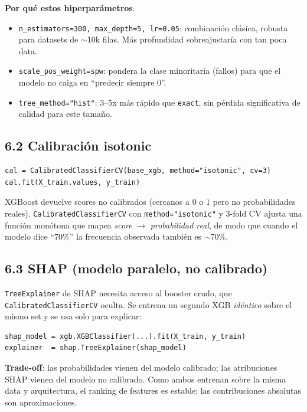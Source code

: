 \documentclass[11pt,a4paper]{article}
\begin{document}
\textbf{Por qué estos hiperparámetros}:

\begin{itemize}
  \item \texttt{n\_estimators=300, max\_depth=5, lr=0.05}: combinación clásica, robusta para datasets de $\sim$10k filas. Más profundidad sobreajustaría con tan poca data.
  \item \texttt{scale\_pos\_weight=spw}: pondera la clase minoritaria (fallos) para que el modelo no caiga en ``predecir siempre 0''.
  \item \texttt{tree\_method="hist"}: 3--5x más rápido que \texttt{exact}, sin pérdida significativa de calidad para este tamaño.
\end{itemize}

\subsection{6.2 Calibración isotonic}

\begin{lstlisting}[language=pyplus]
cal = CalibratedClassifierCV(base_xgb, method="isotonic", cv=3)
cal.fit(X_train.values, y_train)
\end{lstlisting}

XGBoost devuelve scores no calibrados (cercanos a $0$ o $1$ pero no probabilidades reales). \texttt{CalibratedClassifierCV} con \texttt{method="isotonic"} y 3-fold CV ajusta una función monótona que mapea \emph{score} $\rightarrow$ \emph{probabilidad real}, de modo que cuando el modelo dice ``70\%'' la frecuencia observada también es $\sim$70\%.

\subsection{6.3 SHAP (modelo paralelo, no calibrado)}

\texttt{TreeExplainer} de SHAP necesita acceso al booster crudo, que \texttt{CalibratedClassifierCV} oculta. Se entrena un segundo XGB \emph{idéntico} sobre el mismo set y se usa solo para explicar:

\begin{lstlisting}[language=pyplus]
shap_model = xgb.XGBClassifier(...).fit(X_train, y_train)
explainer  = shap.TreeExplainer(shap_model)
\end{lstlisting}

\textbf{Trade-off}: las probabilidades vienen del modelo calibrado; las atribuciones SHAP vienen del modelo no calibrado. Como ambos entrenan sobre la misma data y arquitectura, el ranking de features es estable; las contribuciones absolutas son aproximaciones.
\end{document}

